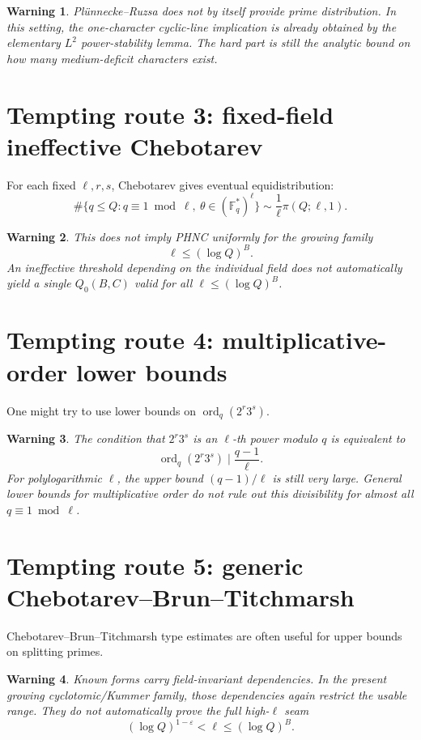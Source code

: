 \documentclass[11pt]{article}
\newtheorem{warning}{Warning}
\newcommand{\F}{\mathbb F}
\newcommand{\1}{\mathbf 1}
\newcommand{\ord}{\operatorname{ord}}
\begin{document}
\begin{warning}
Pl\"unnecke--Ruzsa does not by itself provide prime distribution.  In this setting, the one-character cyclic-line implication is already obtained by the elementary \(L^2\) power-stability lemma.  The hard part is still the analytic bound on how many medium-deficit characters exist.
\end{warning}

\section{Tempting route 3: fixed-field ineffective Chebotarev}

For each fixed \(\ell,r,s\), Chebotarev gives eventual equidistribution:
\[
\#\{q\le Q:q\equiv1\bmod\ell,\ \theta\in(\F_q^*)^\ell\}
\sim
\frac1\ell\pi(Q;\ell,1).
\]

\begin{warning}
This does not imply PHNC uniformly for the growing family
\[
\ell\le(\log Q)^B.
\]
An ineffective threshold depending on the individual field does not automatically yield a single \(Q_0(B,C)\) valid for all \(\ell\le(\log Q)^B\).
\end{warning}

\section{Tempting route 4: multiplicative-order lower bounds}

One might try to use lower bounds on \(\ord_q(2^r3^s)\).

\begin{warning}
The condition that \(2^r3^s\) is an \(\ell\)-th power modulo \(q\) is equivalent to
\[
\ord_q(2^r3^s)\mid\frac{q-1}{\ell}.
\]
For polylogarithmic \(\ell\), the upper bound \((q-1)/\ell\) is still very large.  General lower bounds for multiplicative order do not rule out this divisibility for almost all \(q\equiv1\bmod\ell\).
\end{warning}

\section{Tempting route 5: generic Chebotarev--Brun--Titchmarsh}

Chebotarev--Brun--Titchmarsh type estimates are often useful for upper bounds on splitting primes.

\begin{warning}
Known forms carry field-invariant dependencies.  In the present growing cyclotomic/Kummer family, those dependencies again restrict the usable range.  They do not automatically prove the full high-\(\ell\) seam
\[
(\log Q)^{1-\varepsilon}<\ell\le(\log Q)^B.
\]
\end{warning}
\end{document}
